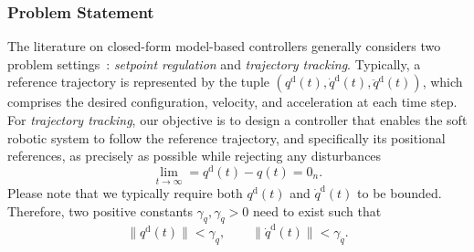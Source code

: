 \subsubsection{Problem Statement}
The literature on closed-form model-based controllers generally considers two problem settings~\citep{sciavicco2012modelling}: \emph{setpoint regulation} and \emph{trajectory tracking}. Typically, a reference trajectory is represented by the tuple $(q^\mathrm{d}(t), \dot{q}^\mathrm{d}(t), \ddot{q}^\mathrm{d}(t))$, which comprises the desired configuration, velocity, and acceleration at each time step. For \emph{trajectory tracking}, our objective is to design a controller that enables the soft robotic system to follow the reference trajectory, and specifically its positional references, as precisely as possible while rejecting any disturbances
\begin{equation}
    \lim_{t \to \infty} = q^\mathrm{d}(t) - q(t) = 0_n.
\end{equation}
Please note that we typically require both $q^\mathrm{d}(t)$ and $\dot{q}^\mathrm{d}(t)$ to be bounded. Therefore, two positive constants $\gamma_q, \gamma_{\dot{q}} > 0$ need to exist such that~\citep{della2020model}
\begin{equation}
    \lVert q^\mathrm{d}(t) \rVert < \gamma_q,
    \qquad
    \lVert \dot{q}^\mathrm{d}(t) \rVert < \gamma_{\dot{q}}.
\end{equation}
